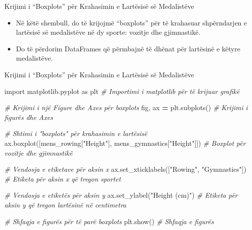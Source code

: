 \documentclass[
  ignorenonframetext,
]{beamer}
\newenvironment{Shaded}{\begin{snugshade}}{\end{snugshade}}
\newcommand{\CommentTok}[1]{\textcolor[rgb]{0.56,0.35,0.01}{\textit{#1}}}
\newcommand{\ImportTok}[1]{#1}
\newcommand{\NormalTok}[1]{#1}
\newcommand{\OperatorTok}[1]{\textcolor[rgb]{0.81,0.36,0.00}{\textbf{#1}}}
\newcommand{\StringTok}[1]{\textcolor[rgb]{0.31,0.60,0.02}{#1}}
\begin{document}
\begin{frame}{Krijimi i ``Boxplots'' për Krahasimin e Lartësisë së
Medalistëve}
\protect\hypertarget{krijimi-i-boxplots-puxebr-krahasimin-e-lartuxebsisuxeb-suxeb-medalistuxebve}{}
\begin{itemize}
\item
  Në këtë shembull, do të krijojmë ``boxplots'' për të krahasuar
  shpërndarjen e lartësisë së medalistëve në dy sporte: vozitje dhe
  gjimnastikë.
\item
  Do të përdorim DataFrames që përmbajnë të dhënat për lartësinë e
  këtyre medalistëve.
\end{itemize}
\end{frame}

\begin{frame}[fragile]{Krijimi i ``Boxplots'' për Krahasimin e Lartësisë
së Medalistëve}
\protect\hypertarget{krijimi-i-boxplots-puxebr-krahasimin-e-lartuxebsisuxeb-suxeb-medalistuxebve-1}{}

\begin{Shaded}
\begin{Highlighting}[]
\ImportTok{import}\NormalTok{ matplotlib.pyplot }\ImportTok{as}\NormalTok{ plt  }\CommentTok{\# Importimi i matplotlib për të krijuar grafikë}

\CommentTok{\# Krijimi i një Figure dhe Axes për boxplots}
\NormalTok{fig, ax }\OperatorTok{=}\NormalTok{ plt.subplots()  }\CommentTok{\# Krijimi i figurës dhe Axes}

\CommentTok{\# Shtimi i "boxplots" për krahasimin e lartësisë}
\NormalTok{ax.boxplot([mens\_rowing[}\StringTok{"Height"}\NormalTok{], mens\_gymnastics[}\StringTok{"Height"}\NormalTok{]])  }\CommentTok{\# Boxplot për vozitje dhe gjimnastikë}

\CommentTok{\# Vendosja e etiketave për aksin x}
\NormalTok{ax.set\_xticklabels([}\StringTok{"Rowing"}\NormalTok{, }\StringTok{"Gymnastics"}\NormalTok{])  }\CommentTok{\# Etiketa për aksin x që tregon sportet}

\CommentTok{\# Vendosja e etiketës për aksin y}
\NormalTok{ax.set\_ylabel(}\StringTok{"Height (cm)"}\NormalTok{)  }\CommentTok{\# Etiketa për aksin y që tregon lartësinë në centimetra}

\CommentTok{\# Shfaqja e figurës për të parë boxplots}
\NormalTok{plt.show()  }\CommentTok{\# Shfaqja e figurës}
\end{Highlighting}
\end{Shaded}
\end{frame}
\end{document}
